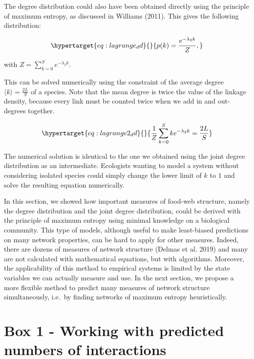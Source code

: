 \documentclass[11pt]{article}
\begin{document}
The degree distribution could also have been obtained directly using the
principle of maximum entropy, as discussed in Williams (2011). This
gives the following distribution:

\begin{equation}\protect\hypertarget{eq:lagrange_dd}{}{p(k) = \frac{e^{-\lambda_2k}}{Z},}\label{eq:lagrange_dd}\end{equation}

with \(Z = \sum_{k=0}^S e^{-\lambda_2k}.\)

This can be solved numerically using the constraint of the average
degree \(\langle k \rangle = \frac{2L}{S}\) of a species. Note that the
mean degree is twice the value of the linkage density, because every
link must be counted twice when we add in and out-degrees together.

\begin{equation}\protect\hypertarget{eq:lagrange2_dd}{}{\frac{1}{Z}\sum_{k=0}^S k e^{-\lambda_2k} = \frac{2L}{S}}\label{eq:lagrange2_dd}\end{equation}

The numerical solution is identical to the one we obtained using the
joint degree distribution as an intermediate. Ecologists wanting to
model a system without considering isolated species could simply change
the lower limit of \(k\) to \(1\) and solve the resulting equation
numerically.

In this section, we showed how important measures of food-web structure,
namely the degree distribution and the joint degree distribution, could
be derived with the principle of maximum entropy using minimal knowledge
on a biological community. This type of models, although useful to make
least-biased predictions on many network properties, can be hard to
apply for other measures. Indeed, there are dozens of measures of
network structure (Delmas et al. 2019) and many are not calculated with
mathematical equations, but with algorithms. Moreover, the applicability
of this method to empirical systems is limited by the state variables we
can actually measure and use. In the next section, we propose a more
flexible method to predict many measures of network structure
simultaneously, i.e.~by finding networks of maximum entropy
heuristically.

\hypertarget{box-1---working-with-predicted-numbers-of-interactions}{%
\section{Box 1 - Working with predicted numbers of
interactions}\label{box-1---working-with-predicted-numbers-of-interactions}}
\end{document}
